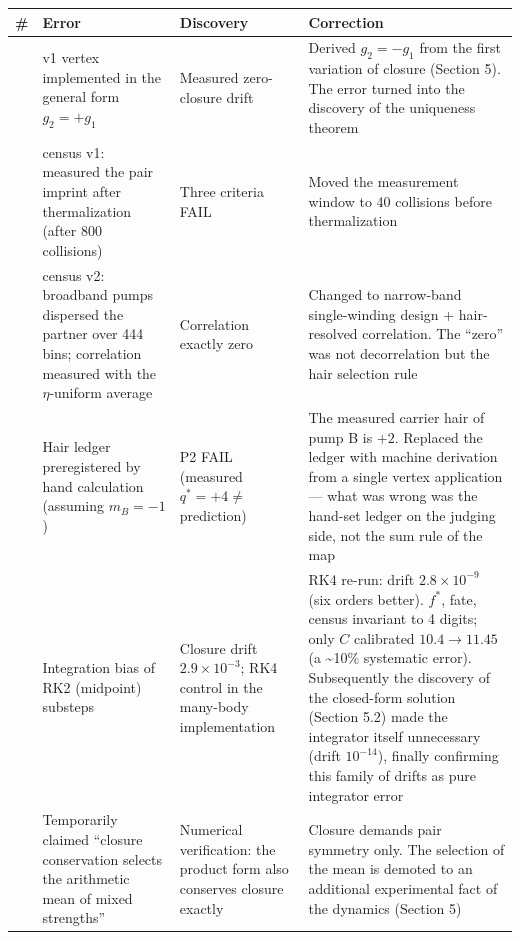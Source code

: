 \documentclass[
  a4paper,
]{article}
\newcounter{none} %
\begin{document}
{\def\LTcaptype{none} %
\begin{longtable}[]{@{}
  >{\raggedright\arraybackslash}p{}
  >{\raggedright\arraybackslash}p{}
  >{\raggedright\arraybackslash}p{}
  >{\raggedright\arraybackslash}p{}@{}}
\toprule\noalign{}
\begin{minipage}[b]{\linewidth}\raggedright
\#
\end{minipage} & \begin{minipage}[b]{\linewidth}\raggedright
Error
\end{minipage} & \begin{minipage}[b]{\linewidth}\raggedright
Discovery
\end{minipage} & \begin{minipage}[b]{\linewidth}\raggedright
Correction
\end{minipage} \\
\midrule\noalign{}
\endhead
\bottomrule\noalign{}
\endlastfoot
1 & v1 vertex implemented in the general form \(g_2=+g_1\) & Measured
zero-closure drift & Derived \(g_2=-g_1\) from the first variation of
closure (Section 5). The error turned into the discovery of the
uniqueness theorem \\
2 & census v1: measured the pair imprint after thermalization (after 800
collisions) & Three criteria FAIL & Moved the measurement window to 40
collisions before thermalization \\
3 & census v2: broadband pumps dispersed the partner over 444 bins;
correlation measured with the \(\eta\)-uniform average & Correlation
exactly zero & Changed to narrow-band single-winding design +
hair-resolved correlation. The ``zero'' was not decorrelation but the
hair selection rule \\
4 & Hair ledger preregistered by hand calculation (assuming \(m_B=-1\))
& P2 FAIL (measured \(q^*=+4\neq\) prediction) & The measured carrier
hair of pump B is \(+2\). Replaced the ledger with machine derivation
from a single vertex application --- what was wrong was the hand-set
ledger on the judging side, not the sum rule of the map \\
5 & Integration bias of RK2 (midpoint) substeps & Closure drift
\(2.9\times10^{-3}\); RK4 control in the many-body implementation & RK4
re-run: drift \(2.8\times10^{-9}\) (six orders better). \(f^*\), fate,
census invariant to 4 digits; only \(C\) calibrated \(10.4\to11.45\) (a
\textasciitilde10\% systematic error). Subsequently the discovery of the
closed-form solution (Section 5.2) made the integrator itself
unnecessary (drift \(10^{-14}\)), finally confirming this family of
drifts as pure integrator error \\
6 & Temporarily claimed ``closure conservation selects the arithmetic
mean of mixed strengths'' & Numerical verification: the product form
also conserves closure exactly & Closure demands pair symmetry only. The
selection of the mean is demoted to an additional experimental fact of
the dynamics (Section 5) \\
\end{longtable}
}
\end{document}
